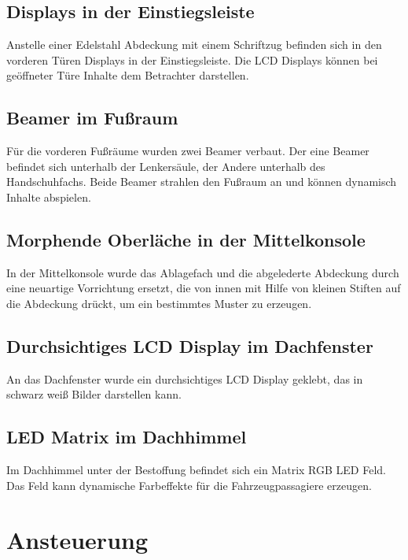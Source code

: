 \subsection{Displays in der Einstiegsleiste}
Anstelle einer Edelstahl Abdeckung mit einem Schriftzug befinden sich in den vorderen Türen Displays in der Einstiegsleiste. Die LCD Displays können bei geöffneter Türe Inhalte dem Betrachter darstellen.
\subsection{Beamer im Fußraum}
Für die vorderen Fußräume wurden zwei Beamer verbaut. Der eine Beamer befindet sich unterhalb der Lenkersäule, der Andere unterhalb des Handschuhfachs. Beide Beamer strahlen den Fußraum an und können dynamisch Inhalte abspielen.
\subsection{Morphende Oberläche in der Mittelkonsole}
In der Mittelkonsole wurde das Ablagefach und die abgelederte Abdeckung durch eine neuartige Vorrichtung ersetzt, die von innen mit Hilfe von kleinen Stiften auf die Abdeckung drückt, um ein bestimmtes Muster zu erzeugen.
\subsection{Durchsichtiges LCD Display im Dachfenster}
An das Dachfenster wurde ein durchsichtiges LCD Display geklebt, das in schwarz weiß Bilder darstellen kann.
\subsection{LED Matrix im Dachhimmel}
Im Dachhimmel unter der Bestoffung befindet sich ein Matrix RGB LED Feld. Das Feld kann dynamische Farbeffekte für die Fahrzeugpassagiere erzeugen.
\section{Ansteuerung}
